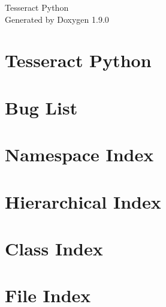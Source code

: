 \let\mypdfximage\pdfximage\def\pdfximage{\immediate\mypdfximage}\documentclass[twoside]{book}
\newcommand{\+}{\discretionary{\mbox{\scriptsize$\hookleftarrow$}}{}{}}
\newcommand{\clearemptydoublepage}{%
  \newpage{\pagestyle{empty}\cleardoublepage}%
}
\begin{document}
\raggedbottom

\hypersetup{pageanchor=false,
             bookmarksnumbered=true,
             pdfencoding=unicode
            }
\begin{titlepage}
\vspace*{7cm}
\begin{center}%
{\Large Tesseract Python }\\
\vspace*{1cm}
{\large Generated by Doxygen 1.9.0}\\
\end{center}
\end{titlepage}
\clearemptydoublepage
{}
\tableofcontents
\clearemptydoublepage
{}
\hypersetup{pageanchor=true}

\chapter{Tesseract Python}
\label{index}\hypertarget{index}{}
\chapter{Bug List}
\label{bug}

\chapter{Namespace Index}

\chapter{Hierarchical Index}

\chapter{Class Index}

\chapter{File Index}

\end{document}
